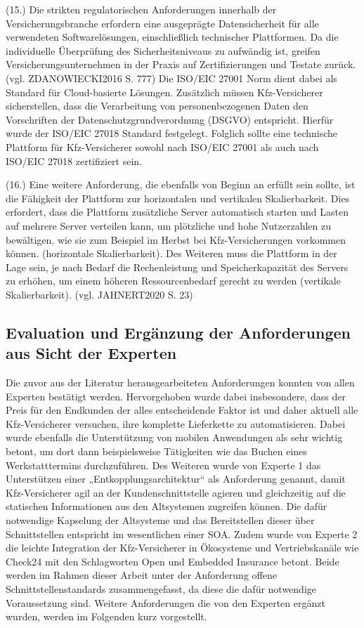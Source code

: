 (15.) Die strikten regulatorischen Anforderungen innerhalb der Versicherungsbranche erfordern eine ausgeprägte Datensicherheit für alle verwendeten Softwarelösungen, einschließlich technischer Plattformen. Da die individuelle Überprüfung des Sicherheitsniveaus zu aufwändig ist, greifen Versicherungsunternehmen in der Praxis auf Zertifizierungen und Testate zurück. (vgl. ZDANOWIECKI2016 S. 777) Die ISO/EIC 27001 Norm dient dabei als Standard für Cloud-basierte Lösungen. Zusätzlich müssen Kfz-Versicherer sicherstellen, dass die Verarbeitung von personenbezogenen Daten den Vorschriften der Datenschutzgrundverordnung (DSGVO) entspricht. Hierfür wurde der ISO/EIC 27018 Standard festgelegt. Folglich sollte eine technische Plattform für Kfz-Versicherer sowohl nach ISO/EIC 27001 als auch nach ISO/EIC 27018 zertifiziert sein. 

(16.) Eine weitere Anforderung, die ebenfalls von Beginn an erfüllt sein sollte, ist die Fähigkeit der Plattform zur horizontalen und vertikalen Skalierbarkeit. Dies erfordert, dass die Plattform zusätzliche Server automatisch starten und Lasten auf mehrere Server verteilen kann, um plötzliche und hohe Nutzerzahlen zu bewältigen, wie sie zum Beispiel im Herbst bei Kfz-Versicherungen vorkommen können. (horizontale Skalierbarkeit). Des Weiteren muss die Plattform in der Lage sein, je nach Bedarf die Rechenleistung und Speicherkapazität des Servers zu erhöhen, um einem höheren Ressourcenbedarf gerecht zu werden (vertikale Skalierbarkeit). (vgl. JAHNERT2020 S. 23)

\subsection{Evaluation und Ergänzung der Anforderungen aus Sicht der Experten}

Die zuvor aus der Literatur herausgearbeiteten Anforderungen konnten von allen Experten bestätigt werden. Hervorgehoben wurde dabei insbesondere, dass der Preis für den Endkunden der alles entscheidende Faktor ist und daher aktuell alle Kfz-Versicherer versuchen, ihre komplette Lieferkette zu automatisieren. Dabei wurde ebenfalls die Unterstützung von mobilen Anwendungen als sehr wichtig betont, um dort dann beispielsweise Tätigkeiten wie das Buchen eines Werkstatttermins durchzuführen. Des Weiteren wurde von Experte 1 das Unterstützen einer „Entkopplungsarchitektur“ als Anforderung genannt, damit Kfz-Versicherer agil an der Kundenschnittstelle agieren und gleichzeitig auf die statischen Informationen aus den Altsystemen zugreifen können. Die dafür notwendige Kapselung der Altsysteme und das Bereitstellen dieser über Schnittstellen entspricht im wesentlichen einer SOA. Zudem wurde von Experte 2 die leichte Integration der Kfz-Versicherer in Ökosysteme und Vertriebskanäle wie Check24 mit den Schlagworten Open und Embedded Insurance betont. Beide werden im Rahmen dieser Arbeit unter der Anforderung offene Schnittstellenstandards zusammengefasst, da diese die dafür notwendige Voraussetzung sind. Weitere Anforderungen die von den Experten ergänzt wurden, werden im Folgenden kurz vorgestellt.


